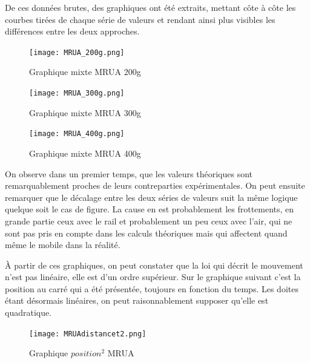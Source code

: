 \newpage

De ces données brutes, des graphiques ont été extraits, mettant côte à côte les courbes tirées de chaque série de valeurs et rendant ainsi plus visibles les différences entre les deux approches.

\begin{figure}[h]
    \caption[Graphique mixte MRUA 200g]{Graphique mixte MRUA 200g}
    \centering
    \texttt{[image: MRUA\_200g.png]}
\end{figure}

\begin{figure}[h]
    \caption[Graphique mixte MRUA 300g]{Graphique mixte MRUA 300g}
    \centering
    \texttt{[image: MRUA\_300g.png]}
\end{figure}
\newpage

\begin{figure}[h]
    \caption[Graphique mixte MRUA 400g]{Graphique mixte MRUA 400g}
    \centering
    \texttt{[image: MRUA\_400g.png]}
\end{figure}

On observe dans un premier temps, que les valeurs théoriques sont remarquablement proches de leurs contreparties expérimentales. On peut ensuite remarquer que le décalage entre les deux séries de valeurs suit la même logique quelque soit le cas de figure. La cause en est probablement les frottements, en grande partie ceux avec le rail et probablement un peu ceux avec l'air, qui ne sont pas pris en compte dans les calculs théoriques mais qui affectent quand même le mobile dans la réalité.

À partir de ces graphiques, on peut constater que la loi qui décrit le mouvement n'est pas linéaire, elle est d'un ordre supérieur. Sur le graphique suivant c'est la position au carré qui a été présentée, toujours en fonction du temps. Les doites étant désormais linéaires, on peut raisonnablement supposer qu'elle est quadratique.

\begin{figure}[h]
    \caption[Graphique $position^2$ MRUA]{Graphique $position^2$ MRUA}
    \centering
    \texttt{[image: MRUAdistancet2.png]}
\end{figure}

\newpage
